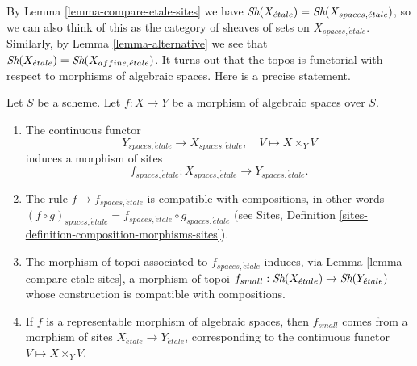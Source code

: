 \noindent
By
Lemma \ref{lemma-compare-etale-sites}
we have
$\mathop{\textit{Sh}}\nolimits(X_{\acute{e}tale}) = \mathop{\textit{Sh}}\nolimits(X_{spaces, \acute{e}tale})$,
so we can also think of this as the category of sheaves of sets on
$X_{spaces, \acute{e}tale}$. Similarly, by
Lemma \ref{lemma-alternative}
we see that
$\mathop{\textit{Sh}}\nolimits(X_{\acute{e}tale}) = \mathop{\textit{Sh}}\nolimits(X_{affine, \acute{e}tale})$.
It turns out that the topos is functorial with respect to morphisms
of algebraic spaces. Here is a precise statement.

\begin{lemma}
\label{lemma-functoriality-etale-site}
Let $S$ be a scheme.
Let $f : X \to Y$ be a morphism of algebraic spaces over $S$.
\begin{enumerate}
\item The continuous functor
$$
Y_{spaces, \acute{e}tale} \longrightarrow X_{spaces, \acute{e}tale}, \quad
V \longmapsto X \times_Y V
$$
induces a morphism of sites
$$
f_{spaces, \acute{e}tale} :
X_{spaces, \acute{e}tale}
\to
Y_{spaces, \acute{e}tale}.
$$
\item The rule $f \mapsto f_{spaces, \acute{e}tale}$ is compatible with
compositions, in other words $(f \circ g)_{spaces, \acute{e}tale}
= f_{spaces, \acute{e}tale} \circ g_{spaces, \acute{e}tale}$ (see
Sites, Definition \ref{sites-definition-composition-morphisms-sites}).
\item The morphism of topoi associated to $f_{spaces, \acute{e}tale}$
induces, via Lemma \ref{lemma-compare-etale-sites}, a morphism of topoi
$f_{small} : \mathop{\textit{Sh}}\nolimits(X_{\acute{e}tale}) \to \mathop{\textit{Sh}}\nolimits(Y_{\acute{e}tale})$
whose construction is compatible with compositions.
\item If $f$ is a representable morphism of algebraic spaces,
then $f_{small}$ comes from a morphism of sites
$X_{\acute{e}tale} \to Y_{\acute{e}tale}$,
corresponding to the continuous functor $V \mapsto X \times_Y V$.
\end{enumerate}
\end{lemma}

